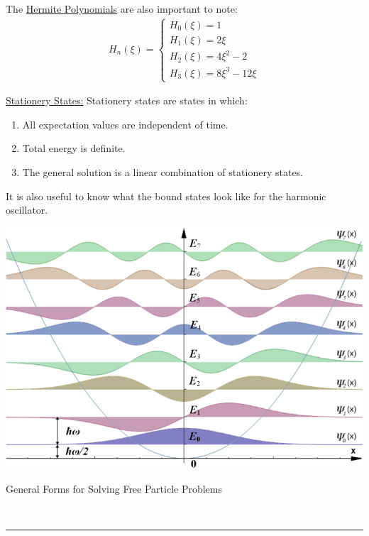 \documentclass{article}
\newcommand{\header}[1]{\begin{large}\noindent #1\end{large}\\\rule{\textwidth}{0.5pt}}
\newcommand{\sheader}[1]{\underline{#1:}}
\begin{document}
    The \underline{Hermite Polynomials} are also important to note:
    \begin{align*}
        H_n(\xi) = \begin{cases}
            H_0(\xi) = 1 \\
            H_1(\xi) = 2\xi\\
            H_2(\xi) = 4\xi^2-2\\
            H_3(\xi) = 8\xi^3 - 12\xi
            \end{cases}
    \end{align*}

    \sheader{Stationery States} Stationery states are states in which:
    \begin{enumerate}
        \item All expectation values are independent of time.
        \item Total energy is definite.
        \item The general solution is a linear combination of stationery
        states.
    \end{enumerate}

    \pagebreak

    It is also useful to know what the bound states look like for
    the harmonic oscillator.

    \begin{center}
        \includegraphics[scale=0.3]{harmonic-oscillator-states.png}
    \end{center}

    \header{General Forms for Solving Free Particle Problems}
\end{document}
